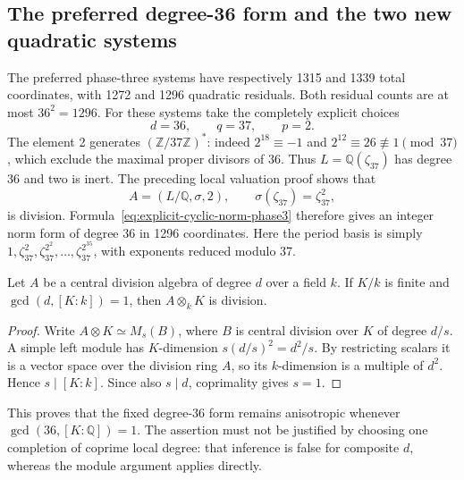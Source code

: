 \subsection{The preferred degree-36 form and the two new quadratic systems}

The preferred phase-three systems have respectively 1315 and 1339
total coordinates, with 1272 and 1296 quadratic residuals.
Both residual counts are at most $36^2=1296$.  For these systems
take the completely explicit choices
\[
                    d=36,\qquad q=37,\qquad p=2.
\]
The element 2 generates $(\mathbb Z/37\mathbb Z)^*$: indeed
$2^{18}\equiv-1$ and $2^{12}\equiv26\not\equiv1\pmod{37}$,
which exclude the maximal proper divisors of 36.
Thus $L=\mathbb Q(\zeta_{37})$ has degree 36 and two is inert.
The preceding local valuation proof shows that
\[
                    A=(L/\mathbb Q,\sigma,2),
             \qquad \sigma(\zeta_{37})=\zeta_{37}^2,
\]
is division.  Formula~\eqref{eq:explicit-cyclic-norm-phase3}
therefore gives an integer norm form of degree 36 in 1296
coordinates.  Here the period basis is simply
$1,\zeta_{37}^{2},\zeta_{37}^{2^2},\ldots,
\zeta_{37}^{2^{35}}$, with exponents reduced modulo 37.

\begin{lemma}\label{lem:division-coprime-base-change-phase3}
Let $A$ be a central division algebra of degree $d$ over a
field $k$.  If $K/k$ is finite and
$\gcd(d,[K:k])=1$, then $A\otimes_k K$ is division.
\end{lemma}
\begin{proof}
Write $A\otimes K\simeq M_s(B)$, where $B$ is central
division over $K$ of degree $d/s$.  A simple left module
has $K$-dimension $s(d/s)^2=d^2/s$.  By restricting scalars
it is a vector space over the division ring $A$, so its
$k$-dimension is a multiple of $d^2$.  Hence
$s\mid[K:k]$.  Since also $s\mid d$, coprimality gives
$s=1$.
\end{proof}

This proves that the fixed degree-36 form remains anisotropic
whenever $\gcd(36,[K:\mathbb Q])=1$.  The assertion must not
be justified by choosing one completion of coprime local degree:
that inference is false for composite $d$, whereas the module
argument applies directly.

